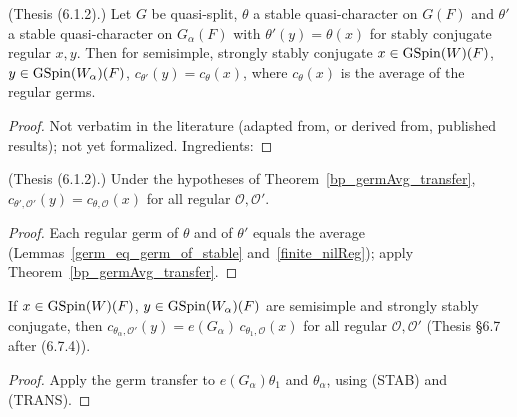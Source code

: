 \begin{theorem}
\label{bp_germAvg_transfer}
\leanok
{}
(Thesis (6.1.2).) Let $G$ be quasi-split, $\theta$ a stable quasi-character on $G(F)$ and $\theta'$ a stable
quasi-character on $G_\alpha(F)$ with $\theta'(y)=\theta(x)$ for stably conjugate regular $x,y$. Then for
semisimple, strongly stably conjugate $x\in\mathrm{GSpin}(W)(F)$, $y\in\mathrm{GSpin}(W_\alpha)(F)$, $c_{\theta'}(y)=c_\theta(x)$,
where $c_\theta(x)$ is the average of the regular germs.
\end{theorem}
\begin{proof}
Not verbatim in the literature (adapted from, or derived from, published results); not yet formalized. Ingredients: 
\end{proof}

\begin{theorem}
\label{bp_germ_transfer}
\leanok
{}
(Thesis (6.1.2).) Under the hypotheses of Theorem~\ref{bp_germAvg_transfer},
$c_{\theta',\mathcal O'}(y)=c_{\theta,\mathcal O}(x)$ for all regular $\mathcal O,\mathcal O'$.
\end{theorem}
\begin{proof}
\leanok
{}
Each regular germ of $\theta$ and of $\theta'$ equals the average (Lemmas~\ref{germ_eq_germ_of_stable}
and~\ref{finite_nilReg}); apply Theorem~\ref{bp_germAvg_transfer}.
\end{proof}

\begin{proposition}
\label{packet_germ_transfer}
\leanok
{}
If $x\in\mathrm{GSpin}(W)(F)$, $y\in\mathrm{GSpin}(W_\alpha)(F)$ are semisimple and strongly stably conjugate, then
$c_{\theta_\alpha,\mathcal O'}(y)=e(G_\alpha)\,c_{\theta_1,\mathcal O}(x)$ for all regular $\mathcal O,\mathcal O'$
(Thesis \S6.7 after (6.7.4)).
\end{proposition}
\begin{proof}
\leanok
{}
Apply the germ transfer to $e(G_\alpha)\theta_1$ and $\theta_\alpha$, using (STAB) and (TRANS).
\end{proof}

